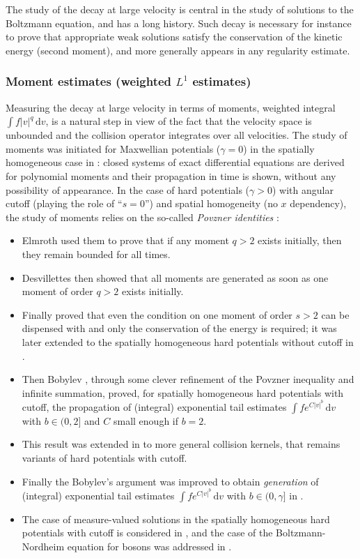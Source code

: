\documentclass[JEP,XML,SOM,Unicode,NoFloatCountersInSection]{cedram}
\theoremstyle{plain}
\theoremstyle{definition}
\numberwithin{equation}{section}
\newcommand{\dd} {\, \mathrm{d}}
\begin{document}
The study of the decay at large velocity is central in the study of
solutions to the Boltzmann equation, and has a long history. Such
decay is necessary for instance to prove that appropriate weak
solutions satisfy the conservation of the kinetic energy (second
moment), and more generally appears in any regularity estimate.

\subsubsection{Moment estimates (weighted $L^1$ estimates)}
Measuring the decay at large velocity in terms of moments,
\ie weighted integral $\int f |v|^q \dd v$, is a natural step in view
of the fact that the velocity space is unbounded and the collision
operator integrates over all velocities. The study of moments was
initiated for Maxwellian potentials ($\gamma=0$) in the spatially
homogeneous case in \cite{MR0075725,MR0075726}: closed systems of
exact differential equations are derived for polynomial moments and
their propagation in time is shown, without any possibility of
appearance. In the case of hard potentials ($\gamma>0$) with angular
cutoff (playing the role of ``$s=0$'') and spatial homogeneity (no $x$
dependency), the study of moments relies on the so-called
\emph{Povzner identities} \cite{MR0142362}:
\begin{itemize}
\item Elmroth \cite{MR684411} used them to prove that if any moment $q>2$
exists initially, then they remain bounded
for all times.
\item Desvillettes \cite{MR1233644} then showed that all moments are
generated as soon as one moment of order $q>2$ exists initially.
\item Finally \cite{MR1697562,MR1716814} proved that even the
condition on one moment of order $s>2$ can be dispensed with and
only the conservation of the energy is required; it was later
extended to the spatially homogeneous hard potentials without cutoff
in \cite{MR1461113}.
\item Then Bobylev \cite{MR1478067}, through some clever refinement of
the Povzner inequality and infinite summation, proved, for
spatially homogeneous hard potentials with cutoff, the propagation
of (integral) exponential tail estimates $\int f e^{C|v|^b} \dd v$
with $b \in (0,2]$ and $C$ small enough if $b=2$.
\item This result was extended in \cite{MR2096050} to more general
collision kernels, that remains variants of hard potentials with cutoff.
\item Finally the Bobylev's argument was improved to obtain
\emph{generation} of (integral) exponential tail estimates
$\int f e^{C|v|^b}\dd v$ with $b \in (0,\gamma]$ in
\cite{MR2264623,MR3005550}.
\item The case of measure-valued solutions in the spatially
homogeneous hard potentials with cutoff is considered in
\cite{MR2871802}, and the case of the Boltzmann-Nordheim equation
for bosons was addressed in \cite{MR3493188}.
\end{itemize}
\end{document}
